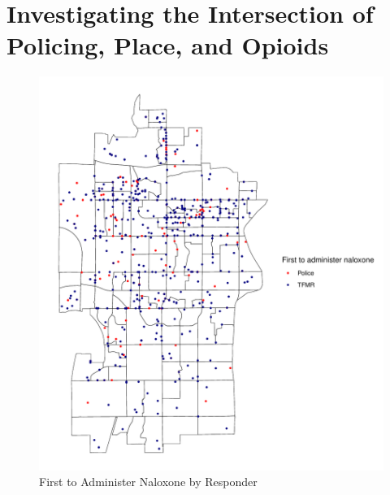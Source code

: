 \chapter{Investigating the Intersection of Policing, Place, and Opioids}



\newpage

\begin{figure}
    \centering
    \caption{First to Administer Naloxone by Responder}
    \includegraphics{figures/first-to-admin.pdf}
\end{figure}